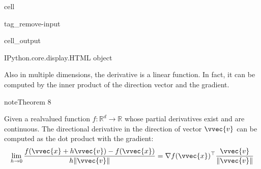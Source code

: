 \documentclass[letterpaper,10pt,english]{jupyterBook}
\begin{document}
\begin{sphinxuseclass}{cell}
\begin{sphinxuseclass}{tag_remove-input}\begin{sphinxVerbatimOutput}

\begin{sphinxuseclass}{cell_output}
\begin{sphinxVerbatim}[commandchars=\\\{\}]
\PYGZlt{}IPython.core.display.HTML object\PYGZgt{}
\end{sphinxVerbatim}

\end{sphinxuseclass}\end{sphinxVerbatimOutput}

\end{sphinxuseclass}
\end{sphinxuseclass}
\sphinxAtStartPar
Also in multiple dimensions, the derivative is a linear function. In fact, it can be computed by the inner product of the direction vector and the gradient.
\label{optimization_numerical:theorem-3}
\begin{sphinxadmonition}{note}{Theorem 8}



\sphinxAtStartPar
Given a real\sphinxhyphen{}valued function \(f:\mathbb{R}^d\rightarrow \mathbb{R}\) whose partial derivatives exist and are continuous. The directional derivative in the direction of vector \(\vvec{v}\) can be computed as the dot product with the gradient:
\begin{equation*}
\begin{split}\lim_{h\rightarrow 0}\frac{f(\vvec{x}+h\vvec{v})-f(\vvec{x})}{h\lVert\vvec{v}\rVert} = \nabla f(\vvec{x})^\top \frac{\vvec{v}}{\lVert\vvec{v}\rVert}\end{split}
\end{equation*}
\end{sphinxadmonition}
\end{document}

